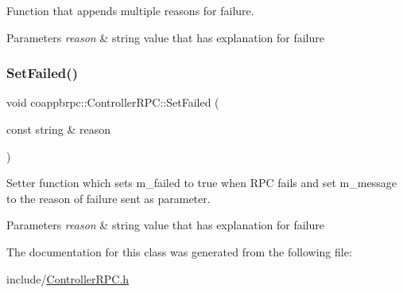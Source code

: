 Function that appends multiple reasons for failure. 


\begin{DoxyParams}{Parameters}
{\em reason} & string value that has explanation for failure \\
\hline
\end{DoxyParams}
\mbox{\label{classcoappbrpc_1_1ControllerRPC_a3d91a6d0ba16232c531c3313e4412212}} 
\subsubsection{\texorpdfstring{Set\+Failed()}{SetFailed()}}
{\footnotesize\ttfamily void coappbrpc\+::\+Controller\+R\+P\+C\+::\+Set\+Failed (\begin{DoxyParamCaption}\item[{const string \&}]{reason }\end{DoxyParamCaption})\hspace{0.3cm}{\ttfamily [inline]}}



Setter function which sets m\+\_\+failed to true when R\+PC fails and set m\+\_\+message to the reason of failure sent as parameter. 


\begin{DoxyParams}{Parameters}
{\em reason} & string value that has explanation for failure \\
\hline
\end{DoxyParams}


The documentation for this class was generated from the following file\+:\begin{DoxyCompactItemize}
\item 
include/\hyperlink{ControllerRPC_8h}{Controller\+R\+P\+C.\+h}\end{DoxyCompactItemize}
